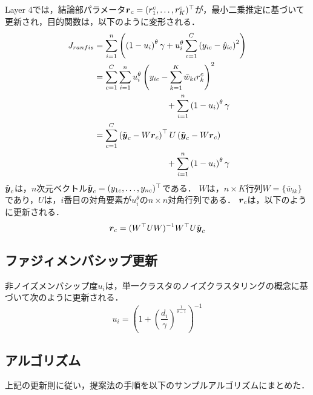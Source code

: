 \documentclass{ujarticle}
\begin{document}
Layer 4では，結論部パラメータ$\mbox{\boldmath $r$}_c = (r_{1}^c, \dots, r_{K}^c)^\top$が，最小二乗推定に基づいて更新され，目的関数は，以下のように変形される．
%
\begin{equation}
\begin{aligned}[b]
J_{ranfis} &=\sum_{i=1}^{n}\left(\left(1-u_{i}\right)^{\theta} \gamma+u_{i}^{\theta} \sum_{c=1}^{C}\left(y_{i c}-\hat{y}_{i c}\right)^{2}\right) \\
&=\sum_{c=1}^{C} \sum_{i=1}^{n} u_{i}^{\theta}\left(y_{i c}-\sum_{k=1}^{K} \bar{w}_{k i} r_{k}^{c}\right)^{2} \\
& \hspace{30mm} +\sum_{i=1}^{n}\left(1-u_{i}\right)^{\theta} \gamma \\
&=\sum_{c=1}^{C}\left(\tilde{\bmath{y}}_{c}-W \bmath{r}_{c}\right)^{\top} U\left(\tilde{\boldsymbol{y}}_{c}-W \bmath{r}_{c}\right) \\
& \hspace{30mm} +\sum_{i=1}^{n}\left(1-u_{i}\right)^{\theta} \gamma
\end{aligned}
\end{equation}
%
$\tilde{\mbox{\boldmath $y$}}_c$は，$n$次元ベクトル$\tilde{\mbox{\boldmath $y$}}_c=(y_{1c}, \dots, y_{nc})^\top$である．
$W$は，$n \times K$行列$W=\{ \bar{w}_{ik} \}$であり，$U$は，$i$番目の対角要素が$u_i^\theta$の$n \times n$対角行列である．
$\mbox{\boldmath $r$}_c$は，以下のように更新される．
%
\begin{equation}
  \mbox{\boldmath $r$}_c = (W^\top U W)^{-1} W^\top U \tilde{\mbox{\boldmath $y$}}_c
\label{eq: LSE of coefficient vector}
\end{equation}
%

\subsection{ファジィメンバシップ更新}

非ノイズメンバシップ度$u_i$は，単一クラスタのノイズクラスタリングの概念に基づいて次のように更新される．
%
\begin{equation}
  u_{i} = \left( 1 + \left( \frac{d_i}{\gamma} \right)^{\frac{1}{\theta-1}} \right)^{-1}
\label{eq: non-noise membership calculation}
\end{equation}
%

\subsection{アルゴリズム}

上記の更新則に従い，提案法の手順を以下のサンプルアルゴリズムにまとめた．
\end{document}
